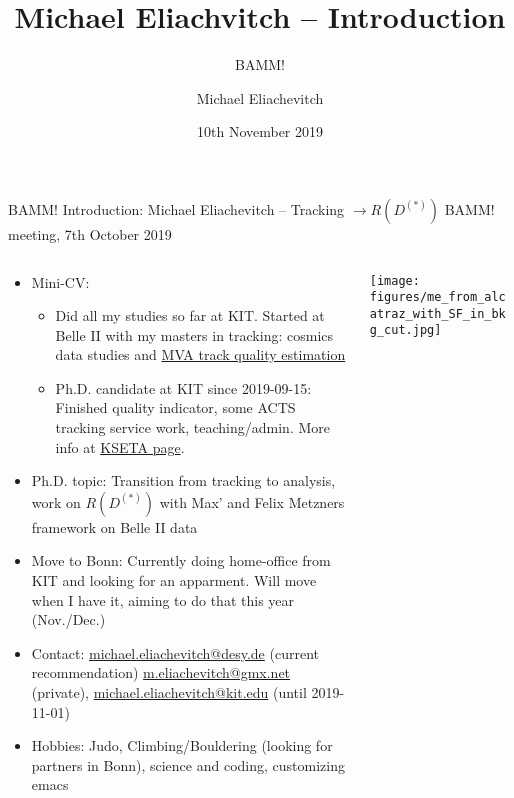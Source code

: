 \documentclass[8pt, numbering=none]{beamer}
\author{Michael Eliachevitch}
\date{10th November 2019}
\title{Michael Eliachvitch -- Introduction}
\subtitle{BAMM!}
\institute{formerly KIT--ETP, now Bonn}
\begin{document}
\begin{frame}[label={sec:org8848681}]{BAMM! Introduction: Michael Eliachevitch -- Tracking \(\rightarrow R(D^{(*)})\)}
\thispagestyle{empty} \centering
BAMM! meeting, 7th October 2019
\begin{columns}
\begin{column}{0.7\columnwidth}
\begin{itemize}
\item \alert{Mini-CV:}
\begin{itemize}
\item Did all my studies so far at KIT. Started at Belle II with my masters in
tracking: cosmics data studies and \href{https://confluence.desy.de/display/BI/MVA+Track+Quality+Indicator}{MVA track quality estimation}
\item Ph.D. candidate at KIT since 2019-09-15: Finished quality indicator,
some ACTS tracking service work, teaching/admin. More info at \href{https://www-kseta.ttp.kit.edu/fellows/Michael.Eliachevitch}{KSETA page}.
\end{itemize}
\item \alert{Ph.D. topic:} Transition from tracking to analysis, work on \(R(D^{(*)})\) with Max' and Felix
Metzners framework on Belle II data
\item \alert{Move to Bonn:} Currently doing home-office from KIT and looking for an
apparment. Will move when I have it, aiming to do that this year (Nov./Dec.)
\item \alert{Contact:} \href{mailto:michael.eliachevitch@desy.de}{michael.eliachevitch@desy.de} (current recommendation) \href{mailto:m.eliachevitch@gmx.net}{m.eliachevitch@gmx.net} (private),
\href{mailto:michael.eliachevitch@kit.edu}{michael.eliachevitch@kit.edu} (until 2019-11-01)\\
\item \alert{Hobbies:} Judo, Climbing/Bouldering (looking for partners in Bonn),
science and coding, customizing emacs
\end{itemize}
\end{column}
\begin{column}{0.3\columnwidth}
\begin{center}
\texttt{[image: figures/me\_from\_alcatraz\_with\_SF\_in\_bkg\_cut.jpg]}
\end{center}
\end{column}
\end{columns}
\end{frame}
\end{document}
